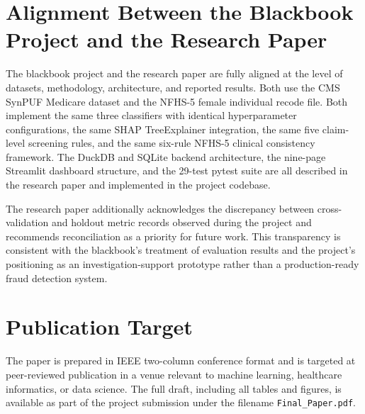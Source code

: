 \section{Alignment Between the Blackbook Project and the Research Paper}

The blackbook project and the research paper are fully aligned at the level of datasets, methodology, architecture, and reported results. Both use the CMS SynPUF Medicare dataset and the NFHS-5 female individual recode file. Both implement the same three classifiers with identical hyperparameter configurations, the same SHAP TreeExplainer integration, the same five claim-level screening rules, and the same six-rule NFHS-5 clinical consistency framework. The DuckDB and SQLite backend architecture, the nine-page Streamlit dashboard structure, and the 29-test pytest suite are all described in the research paper and implemented in the project codebase.

The research paper additionally acknowledges the discrepancy between cross-validation and holdout metric records observed during the project and recommends reconciliation as a priority for future work. This transparency is consistent with the blackbook's treatment of evaluation results and the project's positioning as an investigation-support prototype rather than a production-ready fraud detection system.

\section{Publication Target}

The paper is prepared in IEEE two-column conference format and is targeted at peer-reviewed publication in a venue relevant to machine learning, healthcare informatics, or data science. The full draft, including all tables and figures, is available as part of the project submission under the filename \texttt{Final\_Paper.pdf}.
